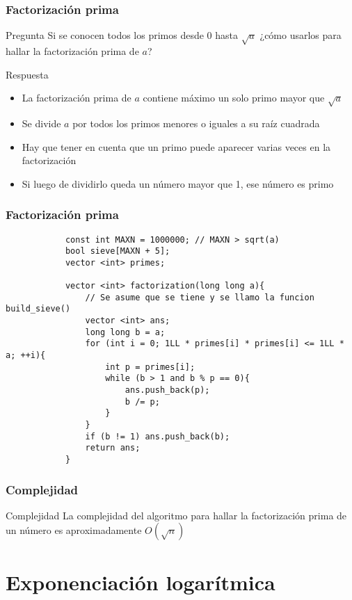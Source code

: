 \documentclass{beamer}
\begin{document}
	\begin{frame}
		\frametitle{Factorización prima}
		\begin{alertblock}{Pregunta}
			Si se conocen todos los primos desde 0 hasta $\sqrt{a}$ ¿cómo usarlos para hallar la factorización prima de $a$?
		\end{alertblock}
		\pause
		\begin{exampleblock}{Respuesta}
			\begin{itemize}
				\item La factorización prima de $a$ contiene máximo un solo primo mayor que $\sqrt{a}$
				\item Se divide $a$ por todos los primos menores o iguales a su raíz cuadrada
				\item Hay que tener en cuenta que un primo puede aparecer varias veces en la factorización
				\item Si luego de dividirlo queda un número mayor que 1, ese número es primo
			\end{itemize}
		\end{exampleblock}
	\end{frame}

	\begin{frame}[fragile]
		\frametitle{Factorización prima}
		\begin{lstlisting}
			const int MAXN = 1000000; // MAXN > sqrt(a)
			bool sieve[MAXN + 5];
			vector <int> primes;
		
			vector <int> factorization(long long a){
			    // Se asume que se tiene y se llamo la funcion build_sieve()
			    vector <int> ans;
			    long long b = a;
			    for (int i = 0; 1LL * primes[i] * primes[i] <= 1LL * a; ++i){
			        int p = primes[i];
			        while (b > 1 and b % p == 0){
			            ans.push_back(p);
			            b /= p;
			        }
			    }
			    if (b != 1) ans.push_back(b);
			    return ans;
			}
		\end{lstlisting}
	\end{frame}
	
	\begin{frame}
		\frametitle{Complejidad}
		\begin{block}{Complejidad}
			La complejidad del algoritmo para hallar la factorización prima de un número es aproximadamente $O(\sqrt{n})$
		\end{block}
	\end{frame}


\section[Bigmod]{Exponenciación logarítmica}
\end{document}
